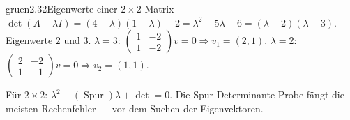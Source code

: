 \begin{loesungkarte}{gruen}{2.32}{Eigenwerte einer $2\times2$-Matrix}
$\det(A - \lambda I) = (4 - \lambda)(1 - \lambda) + 2 = \lambda^{2} - 5\lambda + 6 = (\lambda - 2)(\lambda - 3)$. Eigenwerte $2$ und $3$.
$\lambda = 3$: $\begin{pmatrix}1 & -2\\ 1 & -2\end{pmatrix}v = 0\Rightarrow v_1 = (2, 1)$. $\lambda = 2$: $\begin{pmatrix}2 & -2\\ 1 & -1\end{pmatrix}v = 0\Rightarrow v_2 = (1, 1)$.
\begin{mitnehmen}\kastentext
Für $2\times2$: $\lambda^{2} - (\operatorname{Spur})\lambda + \det = 0$. Die Spur-Determinante-Probe fängt die meisten Rechenfehler --- vor dem Suchen der Eigenvektoren.
\end{mitnehmen}
\end{loesungkarte}

